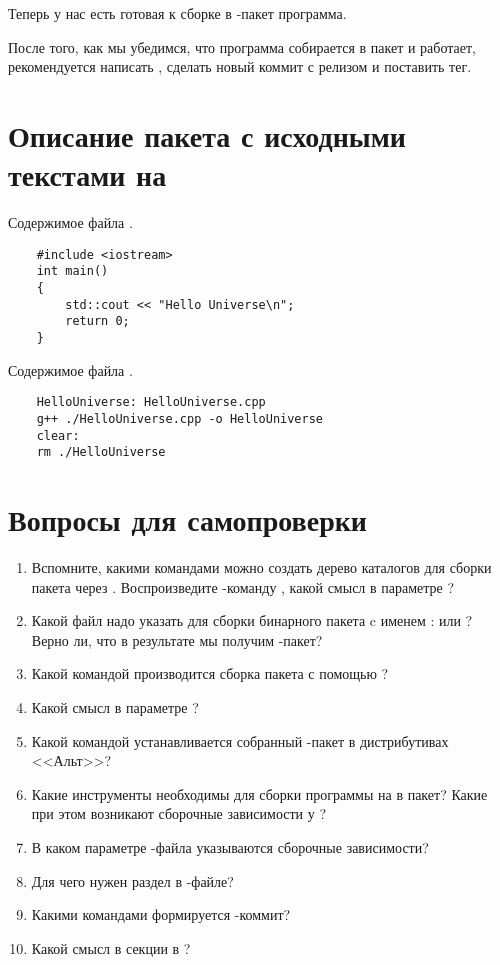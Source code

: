 Теперь у нас есть готовая к сборке в -пакет программа. 

После того, как мы убедимся, что программа собирается в пакет и работает, 
рекомендуется написать , сделать новый коммит с релизом и поставить тег. 


\section{Описание пакета с исходными текстами на }\label{hello_universe_src}
Содержимое файла .
\begin{verbatim}
	#include <iostream>
	int main()
	{
		std::cout << "Hello Universe\n";
		return 0;
	}
\end{verbatim} 

Содержимое файла .
\begin{verbatim}
	HelloUniverse: HelloUniverse.cpp
	g++ ./HelloUniverse.cpp -o HelloUniverse
	clear:
	rm ./HelloUniverse
\end{verbatim}

\section{Вопросы для самопроверки}

\begin{enumerate}
	\item Вспомните, какими командами можно создать дерево каталогов для сборки пакета через .
		Воспроизведите -команду , какой смысл в параметре ?
	\item Какой файл надо указать  для сборки бинарного пакета c именем :  или ?
		Верно ли, что в результате мы получим -пакет?
	\item Какой командой производится сборка пакета с помощью ?  
	\item Какой смысл в параметре ?
	\item Какой командой устанавливается собранный -пакет в дистрибутивах <<Альт>>?  
	\item Какие инструменты необходимы для сборки программы на  в пакет? 
		Какие при этом возникают сборочные зависимости у ?
	\item В каком параметре -файла указываются сборочные зависимости?  
	\item Для чего нужен раздел  в -файле?
	\item Какими командами формируется -коммит?  
	\item Какой смысл в секции  в ?
\end{enumerate}
